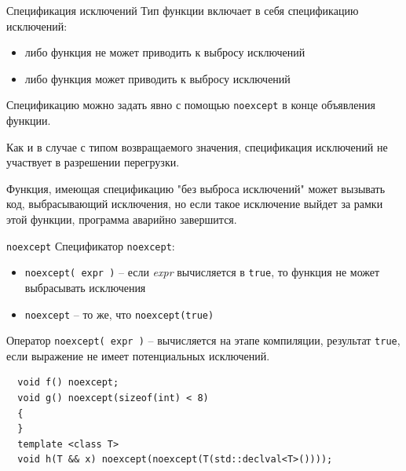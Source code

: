 \documentclass[unknownkeysallowed,xcolor=table]{beamer}
\begin{document}
\begin{frame}{Спецификация исключений}
  Тип функции включает в себя спецификацию исключений:
  \begin{itemize}
    \item либо функция не может приводить к выбросу исключений
    \item либо функция может приводить к выбросу исключений
  \end{itemize}

  \vspace{1em}

  Спецификацию можно задать явно с помощью \lstinline{noexcept} в конце объявления функции.

  \vspace{1em}

  Как и в случае с типом возвращаемого значения, спецификация исключений не участвует в разрешении перегрузки.

  \vspace{1em}

  Функция, имеющая спецификацию "без выброса исключений" может вызывать код, выбрасывающий исключения, но если такое исключение выйдет за рамки этой функции, программа
  аварийно завершится.
\end{frame}

\begin{frame}[fragile]{\lstinline{noexcept}}
  Спецификатор \lstinline{noexcept}:
  \begin{itemize}
    \item \lstinline{noexcept( expr )} -- если \emph{expr} вычисляется в \lstinline{true}, то функция не может выбрасывать исключения
    \item \lstinline{noexcept} -- то же, что \lstinline{noexcept(true)}
  \end{itemize}

  \vspace{1em}

  Оператор \lstinline{noexcept( expr )} -- вычисляется на этапе компиляции, результат \lstinline{true}, если выражение не имеет потенциальных исключений.
  \begin{lstlisting}
  void f() noexcept;
  void g() noexcept(sizeof(int) < 8)
  {
  }
  template <class T>
  void h(T && x) noexcept(noexcept(T(std::declval<T>())));
  \end{lstlisting}
\end{frame}
\end{document}

